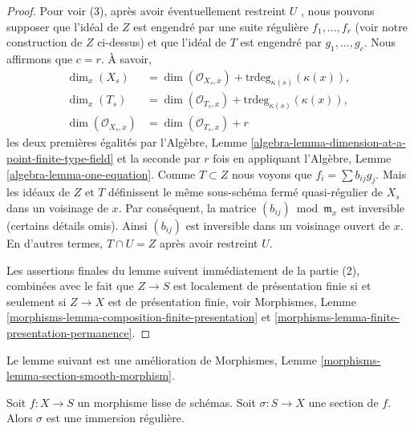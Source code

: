 \begin{proof}
\medskip\noindent
Pour voir (3), après avoir éventuellement restreint  $U$ , nous pouvons
supposer que l'idéal de  $Z$  est engendré par une suite régulière
 $f_1, \ldots, f_r$  (voir notre construction de  $Z$  ci-dessus) et que l'idéal de
 $T$  est engendré par  $g_1, \ldots, g_c$. Nous affirmons que  $c = r$. À
savoir,
\begin{align*}
\dim_x(X_s) & = \dim(\mathcal{O}_{X_s, x}) +
\text{trdeg}_{\kappa(s)}(\kappa(x)), \\
\dim_x(T_s) & = \dim(\mathcal{O}_{T_s, x}) +
\text{trdeg}_{\kappa(s)}(\kappa(x)), \\
\dim(\mathcal{O}_{X_s, x}) & = \dim(\mathcal{O}_{T_s, x}) + r
\end{align*}
les deux premières égalités par l’Algèbre, Lemme  \ref{algebra-lemma-dimension-at-a-point-finite-type-field}  et la seconde par
 $r$  fois en appliquant l’Algèbre, Lemme  \ref{algebra-lemma-one-equation}. Comme  $T \subset Z$ 
nous voyons que  $f_i = \sum b_{ij} g_j$. Mais les idéaux de  $Z$  et  $T$ 
définissent le même sous-schéma fermé quasi-régulier de  $X_s$  dans un
voisinage de  $x$. Par conséquent, la matrice  $(b_{ij}) \bmod \mathfrak m_x$  est inversible
(certains détails omis). Ainsi  $(b_{ij})$  est inversible dans un voisinage
ouvert de  $x$. En d’autres termes,  $T \cap U = Z$  après avoir restreint
 $U$.

\medskip\noindent
Les assertions finales du lemme suivent immédiatement de la partie (2),
combinées avec le fait que  $Z \to S$  est localement de présentation finie si et
seulement si  $Z \to X$  est de présentation finie, voir Morphismes, Lemme
 \ref{morphisms-lemma-composition-finite-presentation}  et  \ref{morphisms-lemma-finite-presentation-permanence}.
\end{proof}

\noindent
Le lemme suivant est une amélioration de Morphismes, Lemme  \ref{morphisms-lemma-section-smooth-morphism}.

\begin{lemma}
\label{lemma-section-smooth-regular-immersion}
Soit  $f : X \to S$  un morphisme lisse de schémas. Soit  $\sigma : S \to X$  une section de
 $f$. Alors  $\sigma$  est une immersion régulière.
\end{lemma}

